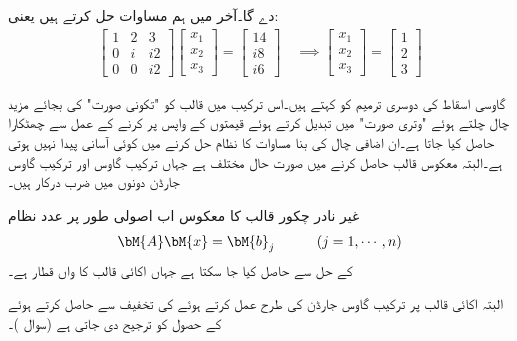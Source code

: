 دے گا۔آخر میں ہم مساوات  حل کرتے ہیں یعنی:
\begin{align*}
\begin{bmatrix}
1&2&3\\
0&i&i2\\
0&0&i2
\end{bmatrix}
\begin{bmatrix}
x_1\\
x_2\\
x_3
\end{bmatrix}=
\begin{bmatrix}
14\\
i8\\
i6
\end{bmatrix}\quad\implies
\begin{bmatrix}
x_1\\
x_2\\
x_3
\end{bmatrix}=
\begin{bmatrix}
1\\
2\\
3
\end{bmatrix}
\end{align*}


گاوسی اسقاط کی دوسری ترمیم کو  کہتے ہیں۔اس ترکیب میں قالب کو "تکونی صورت" کی بجائے مزید چال چلتے ہوئے  "وتری صورت" میں تبدیل کرتے ہوئے قیمتوں کے واپس پر کرنے کے عمل سے چھٹکارا حاصل کیا جاتا ہے۔ان اضافی چال کی بنا مساوات کا نظام حل کرنے میں کوئی آسانی پیدا نہیں ہوتی ہے۔البتہ معکوس قالب حاصل کرنے میں صورت حال مختلف ہے جہاں ترکیب گاوس اور ترکیب گاوس جارڈن دونوں میں  ضرب درکار ہیں۔

غیر نادر چکور قالب  کا معکوس اب اصولی طور پر  عدد نظام
\begin{align}\label{مساوات_خطی_اعدادی_شولسکی_ٹ}
\bM{A}\bM{x}=\bM{b}_j\quad \quad \quad (j=1,\cdots,n)
\end{align}
کے حل سے حاصل کیا جا سکتا ہے جہاں  اکائی قالب کا  واں قطار  ہے۔

البتہ اکائی قالب  پر ترکیب گاوس جارڈن کی طرح عمل کرتے ہوئے  کی تخفیف سے   حاصل کرتے ہوئے  کے حصول کو ترجیح دی جاتی ہے (سوال )۔

